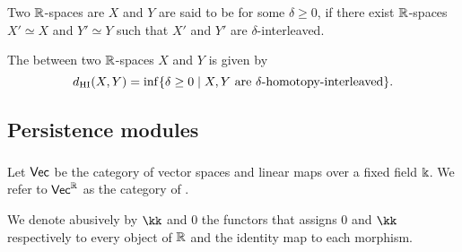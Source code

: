Two $\R$-spaces are $X$ and $Y$ are said to be  for some $\delta \geq 0$, if there exist $\R$-spaces $X' \simeq X$ and $Y' \simeq Y$ such that $X'$ and $Y'$ are $\delta$-interleaved.

The  between two $\R$-spaces $X$ and $Y$ is given by
\[
\dhi(X,Y) = \inf \set{\delta \geq 0 \mid X,Y \text{ are }\delta\text{-homotopy-interleaved}}.
\]

\subsection{Persistence modules}

\subsubsection{}
Let $\Vec$ be the category of vector spaces and linear maps over a fixed field $\k$.
We refer to $\Vec^\R$ as the category of .


We denote abusively by $\kk$ and $0$ the functors that assigns $0$ and $\kk$ respectively to every object of $\R$ and the identity map to each morphism.


